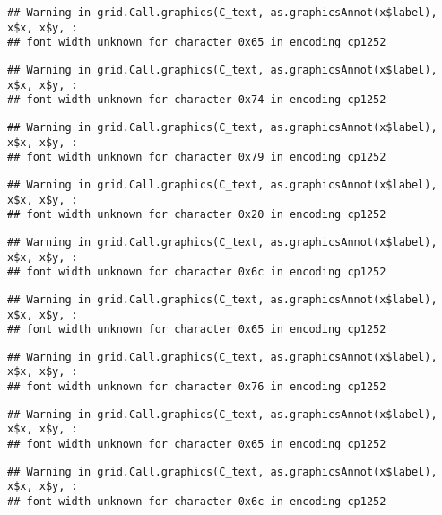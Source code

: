 \documentclass[
]{article}
\begin{document}
\begin{verbatim}
## Warning in grid.Call.graphics(C_text, as.graphicsAnnot(x$label), x$x, x$y, :
## font width unknown for character 0x65 in encoding cp1252
\end{verbatim}

\begin{verbatim}
## Warning in grid.Call.graphics(C_text, as.graphicsAnnot(x$label), x$x, x$y, :
## font width unknown for character 0x74 in encoding cp1252
\end{verbatim}

\begin{verbatim}
## Warning in grid.Call.graphics(C_text, as.graphicsAnnot(x$label), x$x, x$y, :
## font width unknown for character 0x79 in encoding cp1252
\end{verbatim}

\begin{verbatim}
## Warning in grid.Call.graphics(C_text, as.graphicsAnnot(x$label), x$x, x$y, :
## font width unknown for character 0x20 in encoding cp1252
\end{verbatim}

\begin{verbatim}
## Warning in grid.Call.graphics(C_text, as.graphicsAnnot(x$label), x$x, x$y, :
## font width unknown for character 0x6c in encoding cp1252
\end{verbatim}

\begin{verbatim}
## Warning in grid.Call.graphics(C_text, as.graphicsAnnot(x$label), x$x, x$y, :
## font width unknown for character 0x65 in encoding cp1252
\end{verbatim}

\begin{verbatim}
## Warning in grid.Call.graphics(C_text, as.graphicsAnnot(x$label), x$x, x$y, :
## font width unknown for character 0x76 in encoding cp1252
\end{verbatim}

\begin{verbatim}
## Warning in grid.Call.graphics(C_text, as.graphicsAnnot(x$label), x$x, x$y, :
## font width unknown for character 0x65 in encoding cp1252
\end{verbatim}

\begin{verbatim}
## Warning in grid.Call.graphics(C_text, as.graphicsAnnot(x$label), x$x, x$y, :
## font width unknown for character 0x6c in encoding cp1252
\end{verbatim}
\end{document}
